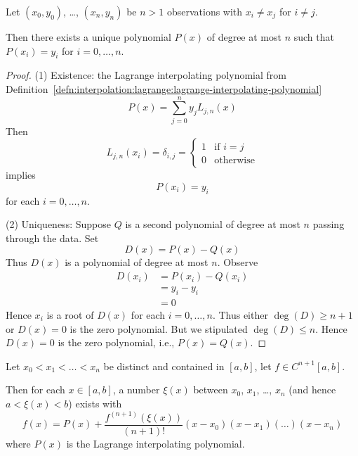 \begin{thm}
Let $(x_{0},y_{0})$, \dots, $(x_{n}, y_{n})$ be $n>1$ observations with
$x_{i}\neq x_{j}$ for $i\neq j$.

Then there exists a unique polynomial $P(x)$ of degree at most $n$ such
that $P(x_{i})=y_{i}$ for $i=0,\dots,n$.
\end{thm}

\begin{proof}
  (1) Existence: the Lagrange interpolating polynomial from Definition~\ref{defn:interpolation:lagrange:lagrange-interpolating-polynomial}
  \begin{equation}
    P(x) = \sum^{n}_{j=0}y_{j}L_{j,n}(x)
  \end{equation}
  Then
  \begin{equation}
    L_{j,n}(x_{i}) = \delta_{i,j} = \begin{cases}1 &\mbox{if $i=j$}\\
      0 & \mbox{otherwise}
    \end{cases}
  \end{equation}
  implies
  \begin{equation}
    P(x_{i})=y_{i}
  \end{equation}
  for each $i=0,\dots,n$.

  (2) Uniqueness: Suppose $Q$ is a second polynomial of degree at most
  $n$ passing through the data. Set
  \begin{equation}
    D(x) = P(x) - Q(x)
  \end{equation}
  Thus $D(x)$ is a polynomial of degree at most $n$. Observe
  \begin{subequations}
    \begin{align}
      D(x_{i}) &= P(x_{i}) - Q(x_{i})\\
      &= y_{i} - y_{i}\\
      &= 0
    \end{align}
  \end{subequations}
  Hence $x_{i}$ is a root of $D(x)$ for each $i=0,\dots,n$.
  Thus either $\deg(D)\geq n+1$ or $D(x)=0$ is the zero polynomial.
  But we stipulated $\deg(D)\leq n$.
  Hence $D(x)=0$ is the zero polynomial, i.e., $P(x)=Q(x)$.
\end{proof}

\begin{thm}[Error]
Let $x_{0}<x_{1}<\dots<x_{n}$ be distinct and contained in $[a,b]$, let
$f\in C^{n+1}[a,b]$.

Then for each $x\in[a,b]$, a number $\xi(x)$ between $x_{0}$, $x_{1}$,
\dots, $x_{n}$ (and hence $a < \xi(x) < b$) exists with
\begin{equation}
  f(x) = P(x) + \frac{f^{(n+1)}(\xi(x))}{(n+1)!}(x-x_{0})(x-x_{1})(\dots)(x-x_{n})
\end{equation}
where $P(x)$ is the Lagrange interpolating polynomial.
\end{thm}

